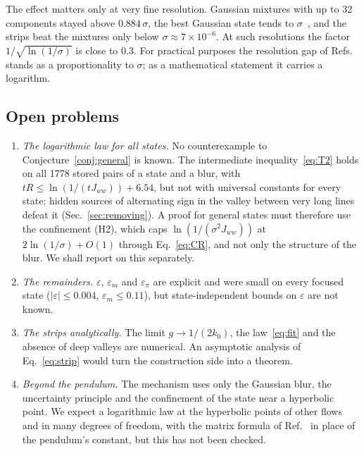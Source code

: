 The effect matters only at very fine resolution. Gaussian mixtures with up to 32 components stayed above $0.884\,\sigma$, the best Gaussian state tends to $\sigma$~\cite{namba2026gap}, and the strips beat the mixtures only below $\sigma \approx 7\times 10^{-6}$. At such resolutions the factor $1/\sqrt{\ln(1/\sigma)}$ is close to $0.3$. For practical purposes the resolution gap of Refs.~\cite{namba2026gap,namba2026many} stands as a proportionality to $\sigma$; as a mathematical statement it carries a logarithm.

\subsection{Open problems}

\begin{enumerate}
\item \emph{The logarithmic law for all states.} No counterexample to Conjecture~\ref{conj:general} is known. The intermediate inequality~\eqref{eq:T2} holds on all 1778 stored pairs of a state and a blur, with $tR \leq \ln(1/(tJ_{ww})) + 6.54$, but not with universal constants for every state: hidden sources of alternating sign in the valley between very long lines defeat it (Sec.~\ref{sec:removing}). A proof for general states must therefore use the confinement (H2), which caps $\ln(1/(\sigma^2J_{ww}))$ at $2\ln(1/\sigma) + O(1)$ through Eq.~\eqref{eq:CR}, and not only the structure of the blur. We shall report on this separately.
\item \emph{The remainders.} $\varepsilon$, $\varepsilon_m$ and $\varepsilon_\pi$ are explicit and were small on every focused state ($|\varepsilon| \leq 0.004$, $\varepsilon_m \leq 0.11$), but state-independent bounds on $\varepsilon$ are not known.
\item \emph{The strips analytically.} The limit $g \to 1/(2k_0)$, the law~\eqref{eq:fit} and the absence of deep valleys are numerical. An asymptotic analysis of Eq.~\eqref{eq:strip} would turn the construction side into a theorem.
\item \emph{Beyond the pendulum.} The mechanism uses only the Gaussian blur, the uncertainty principle and the confinement of the state near a hyperbolic point. We expect a logarithmic law at the hyperbolic points of other flows and in many degrees of freedom, with the matrix formula of Ref.~\cite{namba2026many} in place of the pendulum's constant, but this has not been checked.
\end{enumerate}

